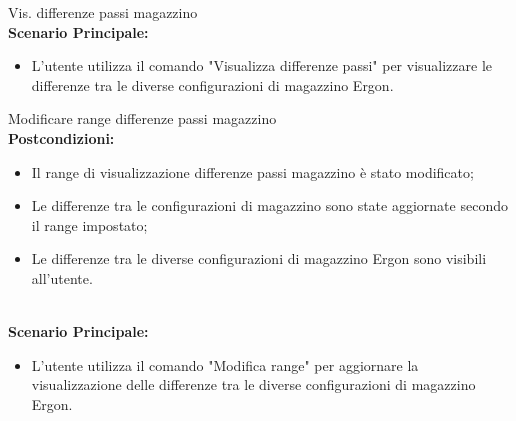 \begin{usecase}{13}{Vis. differenze passi magazzino}
\textbf{\\Scenario Principale:}
\begin{itemize}
    \item L'utente utilizza il comando "Visualizza differenze passi" per visualizzare le differenze tra le diverse configurazioni di magazzino Ergon.
\end{itemize}
\label{uc:scenario-principale}
\end{usecase}
\begin{usecase}{14}{Modificare range differenze passi magazzino}
\textbf{\\Postcondizioni:}
\begin{itemize}
    \item Il range di visualizzazione differenze passi magazzino è stato modificato;
    \item Le differenze tra le configurazioni di magazzino sono state aggiornate secondo il range impostato;
    \item Le differenze tra le diverse configurazioni di magazzino Ergon sono visibili all'utente.
\end{itemize}
\textbf{\\Scenario Principale:}
\begin{itemize}
    \item L'utente utilizza il comando "Modifica range" per aggiornare la visualizzazione delle differenze tra le diverse configurazioni di magazzino Ergon.
\end{itemize}
\label{uc:scenario-principale}
\end{usecase} 
